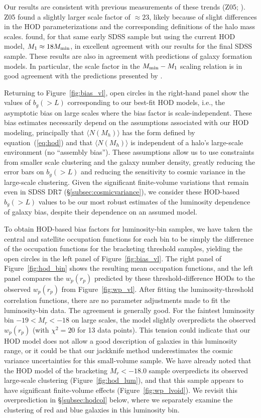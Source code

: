\documentclass[]{emulateapj}
\newcommand{\wrp}{{w_p(r_p)}}
\begin{document}
Our results are consistent with previous measurements of these trends
(Z05; \citealt{zheng07}). Z05 found a slightly larger scale factor of 
$\approx 23$, likely because of slight differences in the HOD parameterizations
and the corresponding definitions of the halo mass scales. \citet{zheng07} 
found, for that same early SDSS sample but using the current HOD
model, $M_1 \approx 18 M_{\rm min}$, 
in excellent agreement with our results for the final SDSS sample.
% 
These results are also in agreement with predictions of galaxy formation
models. In particular, the scale factor in the $M_{\rm min} - M_1$ scaling 
relation is in good agreement with the predictions presented by 
\citet{zheng05}. 

Returning to Figure~\ref{fig:bias_vl}, open circles in the right-hand
panel show the values of $b_g(>L)$ corresponding to our best-fit HOD
models, i.e., the asymptotic bias on large scales where the bias
factor is scale-independent.
These bias estimates necessarily depend on the assumptions associated
with our HOD modeling, principally that $\langle N(M_h) \rangle$ has the
form defined by equation~(\ref{eq:hod}) and that $\langle N(M_h) \rangle$
is independent of a halo's large-scale environment
(no ``assembly bias'').  These assumptions allow us to use
constraints from smaller scale clustering and the galaxy number
density, greatly reducing the error bars on $b_g(>L)$ and reducing
the sensitivity to cosmic variance in the large-scale clustering.
Given the significant finite-volume variations that remain even in
SDSS DR7 (\S\ref{subsec:cosmicvariance}), we consider these HOD-based
$b_g(>L)$ values to be our most robust estimates of the luminosity
dependence of galaxy bias, despite their dependence on an assumed
model.  


To obtain HOD-based bias factors for luminosity-bin samples, we have
taken the central and satellite occupation functions for each bin to be
simply the difference of the occupation functions for the bracketing
threshold samples, yielding the open circles in the left panel of
Figure~\ref{fig:bias_vl}.  The right panel of Figure~\ref{fig:hod_bin} 
shows the resulting mean occupation functions, and the left panel compares the
$\wrp$ predicted by these threshold-difference HODs to the 
observed $\wrp$ from Figure~\ref{fig:wp_vl}. After fitting the 
luminosity-threshold correlation functions, there are no parameter
adjustments made to fit the luminosity-bin data.  The agreement is generally
good. For the faintest luminosity bin $-19 < M_r < -18$ on large scales,
the model slightly overpredicts the observed $\wrp$ (with $\chi^2 = 20$ for 
13 data points). This tension could indicate that our HOD model does not allow
a good description of galaxies in this luminosity range, or
it could be that our jackknife method underestimates the 
cosmic variance uncertainties for this small-volume sample.
We have already noted that the HOD model of the bracketing $M_r<-18.0$
sample overpredicts its observed large-scale clustering 
(Figure~\ref{fig:hod_lum}), and that this
sample appears to have significant finite-volume effects
(Figure~\ref{fig:wp_lvoid}).
We revisit this overprediction in \S\ref{subsec:hodcol} below,
where we separately examine the clustering of red and blue galaxies
in this luminosity bin.
\end{document}
